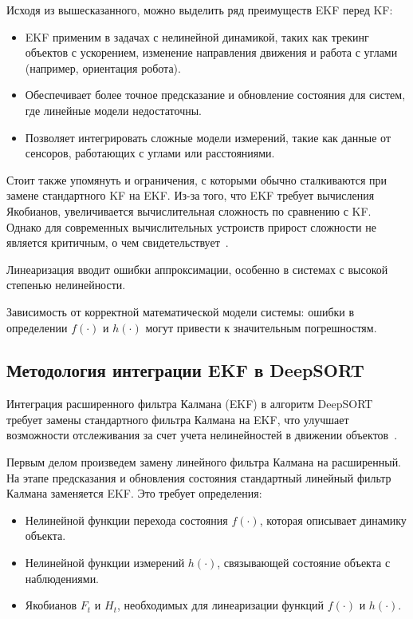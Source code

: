 Исходя из вышесказанного, можно выделить ряд преимуществ EKF перед KF:

\begin{itemize}

    \item EKF применим в задачах с нелинейной динамикой, таких как трекинг объектов с ускорением, изменение направления движения и работа с углами (например, ориентация робота).

    \item Обеспечивает более точное предсказание и обновление состояния для систем, где линейные модели недостаточны.

    \item Позволяет интегрировать сложные модели измерений, такие как данные от сенсоров, работающих с углами или расстояниями.

\end{itemize}

Стоит также упомянуть и ограничения, с которыми обычно сталкиваются при замене стандартного KF на EKF. Из-за того, что EKF 
требует вычисления Якобианов, увеличивается вычислительная сложность по сравнению с KF. Однако для современных вычислительных устроиств прирост сложности не является критичным, о чем свидетельствует~\cite{ponticelli2024comparison}.

Линеаризация вводит ошибки аппроксимации, особенно в системах с высокой степенью нелинейности.

Зависимость от корректной математической модели системы: ошибки в определении $f(\cdot)$ и $h(\cdot)$ могут привести к значительным погрешностям.



\subsection{Методология интеграции EKF в DeepSORT}

Интеграция расширенного фильтра Калмана (EKF) в алгоритм DeepSORT требует замены стандартного фильтра Калмана на EKF, что улучшает возможности отслеживания за счет учета нелинейностей в движении объектов~\cite{bewley2016simple}.

Первым делом произведем замену линейного фильтра Калмана на расширенный. На этапе предсказания и обновления состояния стандартный линейный фильтр Калмана заменяется EKF. Это требует определения:

\begin{itemize}

    \item Нелинейной функции перехода состояния $f(\cdot)$, которая описывает динамику объекта.

    \item Нелинейной функции измерений $h(\cdot)$, связывающей состояние объекта с наблюдениями.

    \item Якобианов ${F}_t$ и ${H}_t$, необходимых для линеаризации функций $f(\cdot)$ и $h(\cdot)$.

\end{itemize}

